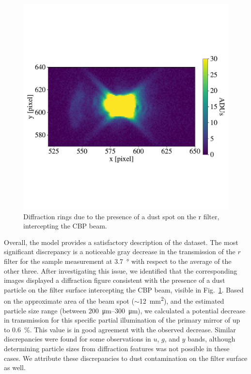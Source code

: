 \begin{figure}
  \centering
  \includegraphics[width=1\linewidth]{fig/diffraction_dust.pdf}
  \caption{Diffraction rings due to the presence of a dust spot on the
    r filter, intercepting the CBP beam.}
  \label{fig:dust}
\end{figure}


Overall, the model provides a satisfactory description of the
dataset. The most significant discrepancy is a noticeable gray
decrease in the transmission of the $r$ filter for the sample
measurement at \SI{3.7}{\degree} with respect to the average of the
other three.  After investigating this issue, we identified that the
corresponding images displayed a diffraction figure consistent with
the presence of a dust particle on the filter surface intercepting the
CBP beam, visible in Fig.~\ref{fig:dust}. Based on the approximate area of the beam spot
($\sim$\SI{12}{\milli\metre\squared}), and the estimated particle size range (between
\SIrange{200}{300}{\micro\metre}), we calculated a potential decrease
in transmission for this specific partial illumination of the primary
mirror of up to \SI{0.6}{\percent}. This value is in good agreement
with the observed decrease. Similar discrepancies were found for some
observations in $u$, $g$, and $y$ bands, although determining particle
sizes from diffraction features was not possible in these cases. We
attribute these discrepancies to dust contamination on the filter
surface as well.

